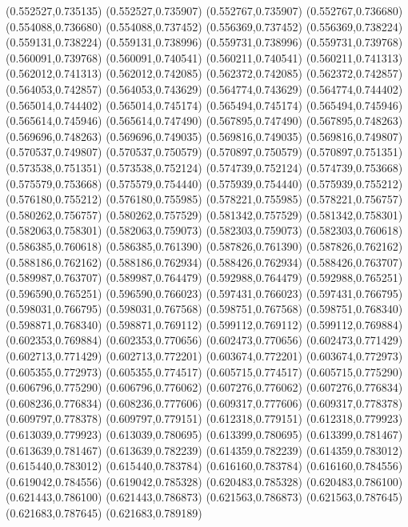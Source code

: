 (0.552527,0.735135)
(0.552527,0.735907)
(0.552767,0.735907)
(0.552767,0.736680)
(0.554088,0.736680)
(0.554088,0.737452)
(0.556369,0.737452)
(0.556369,0.738224)
(0.559131,0.738224)
(0.559131,0.738996)
(0.559731,0.738996)
(0.559731,0.739768)
(0.560091,0.739768)
(0.560091,0.740541)
(0.560211,0.740541)
(0.560211,0.741313)
(0.562012,0.741313)
(0.562012,0.742085)
(0.562372,0.742085)
(0.562372,0.742857)
(0.564053,0.742857)
(0.564053,0.743629)
(0.564774,0.743629)
(0.564774,0.744402)
(0.565014,0.744402)
(0.565014,0.745174)
(0.565494,0.745174)
(0.565494,0.745946)
(0.565614,0.745946)
(0.565614,0.747490)
(0.567895,0.747490)
(0.567895,0.748263)
(0.569696,0.748263)
(0.569696,0.749035)
(0.569816,0.749035)
(0.569816,0.749807)
(0.570537,0.749807)
(0.570537,0.750579)
(0.570897,0.750579)
(0.570897,0.751351)
(0.573538,0.751351)
(0.573538,0.752124)
(0.574739,0.752124)
(0.574739,0.753668)
(0.575579,0.753668)
(0.575579,0.754440)
(0.575939,0.754440)
(0.575939,0.755212)
(0.576180,0.755212)
(0.576180,0.755985)
(0.578221,0.755985)
(0.578221,0.756757)
(0.580262,0.756757)
(0.580262,0.757529)
(0.581342,0.757529)
(0.581342,0.758301)
(0.582063,0.758301)
(0.582063,0.759073)
(0.582303,0.759073)
(0.582303,0.760618)
(0.586385,0.760618)
(0.586385,0.761390)
(0.587826,0.761390)
(0.587826,0.762162)
(0.588186,0.762162)
(0.588186,0.762934)
(0.588426,0.762934)
(0.588426,0.763707)
(0.589987,0.763707)
(0.589987,0.764479)
(0.592988,0.764479)
(0.592988,0.765251)
(0.596590,0.765251)
(0.596590,0.766023)
(0.597431,0.766023)
(0.597431,0.766795)
(0.598031,0.766795)
(0.598031,0.767568)
(0.598751,0.767568)
(0.598751,0.768340)
(0.598871,0.768340)
(0.598871,0.769112)
(0.599112,0.769112)
(0.599112,0.769884)
(0.602353,0.769884)
(0.602353,0.770656)
(0.602473,0.770656)
(0.602473,0.771429)
(0.602713,0.771429)
(0.602713,0.772201)
(0.603674,0.772201)
(0.603674,0.772973)
(0.605355,0.772973)
(0.605355,0.774517)
(0.605715,0.774517)
(0.605715,0.775290)
(0.606796,0.775290)
(0.606796,0.776062)
(0.607276,0.776062)
(0.607276,0.776834)
(0.608236,0.776834)
(0.608236,0.777606)
(0.609317,0.777606)
(0.609317,0.778378)
(0.609797,0.778378)
(0.609797,0.779151)
(0.612318,0.779151)
(0.612318,0.779923)
(0.613039,0.779923)
(0.613039,0.780695)
(0.613399,0.780695)
(0.613399,0.781467)
(0.613639,0.781467)
(0.613639,0.782239)
(0.614359,0.782239)
(0.614359,0.783012)
(0.615440,0.783012)
(0.615440,0.783784)
(0.616160,0.783784)
(0.616160,0.784556)
(0.619042,0.784556)
(0.619042,0.785328)
(0.620483,0.785328)
(0.620483,0.786100)
(0.621443,0.786100)
(0.621443,0.786873)
(0.621563,0.786873)
(0.621563,0.787645)
(0.621683,0.787645)
(0.621683,0.789189)
